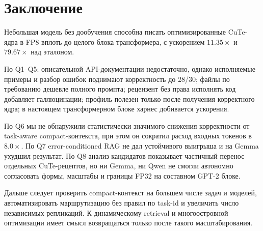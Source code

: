 \documentclass[10pt,a4paper]{article}
\begin{document}
\section{Заключение}

Небольшая модель без дообучения способна писать оптимизированные CuTe-ядра в
FP8 вплоть до целого блока трансформера, с ускорением $11.35\times$ и
$79.67\times$ над эталоном.

По Q1--Q5: описательной API-документации недостаточно, однако исполняемые
примеры и разбор ошибок поднимают корректность до 28/30; файлы по требованию
дешевле полного промпта; рецензент без права исполнять код добавляет
галлюцинации; профиль полезен только после получения корректного ядра; в
настоящем трансформерном блоке харнес добивается ускорения.

По Q6 мы не обнаружили статистически значимого снижения корректности от
task-aware compact-контекста, при этом он сократил расход входных токенов в
$8.0\times$. По Q7 error-conditioned RAG не дал устойчивого выигрыша и на
Gemma ухудшил результат. По Q8 анализ кандидатов показывает частичный перенос
отдельных CuTe-рецептов, но ни Gemma, ни Qwen не смогли автономно согласовать
формы, масштабы и границы FP32 на составном GPT-2 блоке.

Дальше следует проверить compact-контекст на большем числе задач и моделей,
автоматизировать маршрутизацию без правил по task-id и увеличить число
независимых репликаций. К динамическому retrieval и многоостровной оптимизации
имеет смысл возвращаться только после такого масштабирования.
\end{document}
